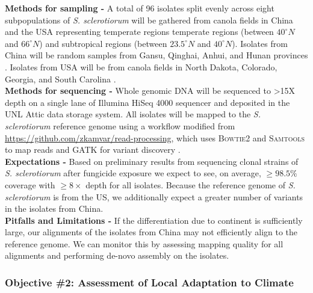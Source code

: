 \documentclass[12pt,letterpaper]{article}
\begin{document}
\noindent \textbf{Methods for sampling -}
A total of 96 isolates split evenly across eight subpopulations of \textit{S. sclerotiorum} will be gathered from canola fields in China and the USA representing temperate regions temperate regions (between $40^{\circ}N$ and $66^{\circ}N$) and subtropical regions (between $23.5^{\circ}N$ and $40^{\circ}N$).
Isolates from China will be random samples from Gansu, Qinghai, Anhui, and Hunan provinces \citep{zhou2014dimethachlon, attanayake2013sclerotinia}.
Isolates from USA will be from canola fields in North Dakota, Colorado, Georgia, and South Carolina \citep{aldrich-wolfe2015genetic,phillips2002phylogeography}.\\
\noindent \textbf{Methods for sequencing -} 
Whole genomic DNA will be sequenced to >15X depth on a single lane of Illumina HiSeq 4000 sequencer and deposited in the UNL Attic data storage system. 
All isolates will be mapped to the \textit{S. sclerotiorum} reference genome using a workflow modified from \url{https://github.com/zkamvar/read-processing}, which uses \textsc{Bowtie2} and \textsc{Samtools} to map reads and \textsc{GATK} for variant discovery \citep{langmead2012fast, li2009sequence, mckenna2010genome, derbyshire2017complete}.\\ 
\noindent \textbf{Expectations -}
Based on preliminary results from sequencing clonal strains of \textit{S. sclerotiorum} after fungicide exposure we expect to see, on average, $\geq98.5\%$ coverage with $\geq8\times$ depth for all isolates. Because the reference genome of \textit{S. sclerotiorum} is from the US, we additionally expect a greater number of variants in the isolates from China.\\
\noindent \textbf{Pitfalls and Limitations -}
If the differentiation due to continent is sufficiently large, our alignments of the isolates from China may not efficiently align to the reference genome. 
We can monitor this by assessing mapping quality for all alignments and performing de-novo assembly on the isolates.

\subsubsection{Objective \#2: Assessment of Local Adaptation to Climate}
\end{document}
